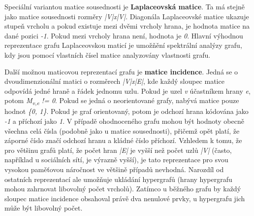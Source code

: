 Speciální variantou matice sousednosti je \textbf{Laplaceovská matice}. Ta má stejně jako matice sousednosti rozměry \textit{|V|x|V|}. Diagonála Laplaceovské matice ukazuje stupeň vrcholu a pokud existuje mezi dvěmi vrcholy hrana, je hodnota matice na dané pozici \textit{-1}. Pokud mezi vrcholy hrana není, hodnota je \textit{0}. Hlavní výhodnou reprezentace grafu Laplaceovskou maticí je umožňění spektrální analýzy grafu\cite{Barnard93}, kdy jsou pomocí vlastních čísel matice analyzovány vlastnosti grafu.

Další možnou maticovou reprezentací grafu je \textbf{matice incidence}. Jedná se o dvoudimenzionální matici o rozměrech \textit{|V|x|E|}, kde každý sloupec matice odpovídá jedné hraně a řádek jednomu uzlu. Pokud je uzel \textit{v} účastníkem hrany \textit{e}, potom \textit{M\textsubscript{v,e} != 0}. Pokud se jedná o neorientované grafy, nabývá matice pouze hodnot \textit{\{0, 1\}}. Pokud je graf orientovaný, potom je odchozí hrana kódována jako \textit{-1} a příchozí jako \textit{1}. V případě ohodnoceného grafu mohou být hodnoty obecně všechna celá čísla (podobně jako u matice sousednosti), přičemž opět platí, že záporné číslo značí odchozí hranu a kládné číslo příchozí. Vzhledem k tomu, že pro většinu grafů platí, že počet hran \textit{|E|} je vyšší než počet uzlů \textit{|V|} (často, například u sociálních sítí, je výrazně vyšší), je tato reprezentace pro svou vysokou paměťovou náročnost ve většině případů nevhodná. Narozdíl od ostatních reprezentací ale umožňuje ukládání hypergrafů (hrany hypergrafu mohou zahrnovat libovolný počet vrcholů). Zatímco u běžného grafu by každý sloupec matice incidence obsahoval právě dva nenulové prvky, u hypergrafu jich může být libovolný počet.

